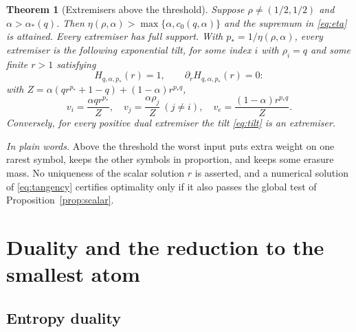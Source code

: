 \documentclass[11pt,a4paper]{article}
\numberwithin{equation}{section}
\newtheorem{theorem}{Theorem}[section]
\theoremstyle{definition}
\theoremstyle{remark}
\newcommand{\ac}{\alpha_*}
\newcommand{\plain}[1]{\par\smallskip\noindent\textit{In plain words.} #1\par\smallskip}
\begin{document}
\begin{theorem}[Extremisers above the threshold]\label{thm:supercritical}
Suppose \(\rho\ne(1/2,1/2)\) and \(\alpha>\ac(q)\). Then
\(\eta(\rho,\alpha)>\max\{\alpha,c_0(q,\alpha)\}\) and the supremum in
\eqref{eq:eta} is attained. Every extremiser has full support. With
\(p_*=1/\eta(\rho,\alpha)\), every extremiser is the following exponential
tilt, for some index \(i\) with \(\rho_i=q\) and some finite \(r>1\)
satisfying
\begin{equation}\label{eq:tangency}
H_{q,\alpha,p_*}(r)=1,\qquad
\partial_r H_{q,\alpha,p_*}(r)=0 :
\end{equation}
with \(Z=\alpha(qr^{p_*}+1-q)+(1-\alpha)r^{p_*q}\),
\begin{equation}\label{eq:tilt}
v_i=\frac{\alpha q r^{p_*}}{Z},\quad
v_j=\frac{\alpha\rho_j}{Z}\ (j\ne i),\quad
v_e=\frac{(1-\alpha)r^{p_*q}}{Z}.
\end{equation}
Conversely, for every positive dual extremiser the tilt \eqref{eq:tilt} is
an extremiser.
\end{theorem}
\plain{Above the threshold the worst input puts extra weight on one rarest
symbol, keeps the other symbols in proportion, and keeps some erasure
mass. No uniqueness of the scalar solution \(r\) is asserted, and a
numerical solution of \eqref{eq:tangency} certifies optimality only if it
also passes the global test of Proposition~\ref{prop:scalar}.}

\section{Duality and the reduction to the smallest atom}\label{sec:reduction}

\subsection{Entropy duality}
\end{document}

